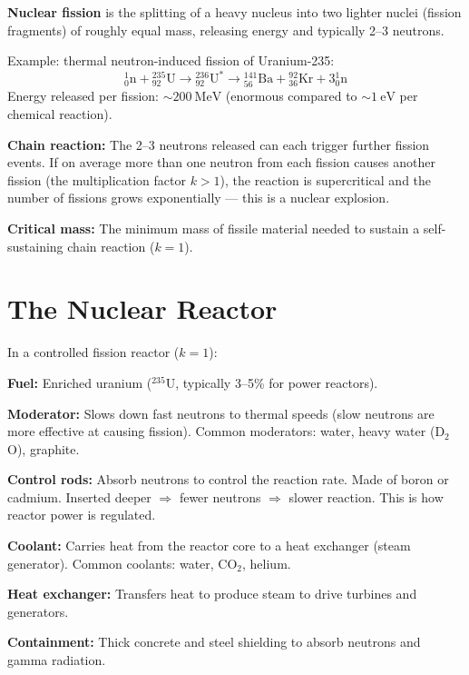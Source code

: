 \begin{definitionbox}
\textbf{Nuclear fission} is the splitting of a heavy
nucleus into two lighter nuclei (fission fragments)
of roughly equal mass, releasing energy and typically
2--3 neutrons.

Example: thermal neutron-induced fission of Uranium-235:
\[
  {}^{1}_{0}\text{n} + {}^{235}_{92}\text{U}
  \rightarrow {}^{236}_{92}\text{U}^*
  \rightarrow {}^{141}_{56}\text{Ba}
  + {}^{92}_{36}\text{Kr}
  + 3{}^{1}_{0}\text{n}
\]
Energy released per fission: $\sim 200\ \text{MeV}$
(enormous compared to $\sim 1\ \text{eV}$ per chemical
reaction).

\textbf{Chain reaction:} The 2--3 neutrons released
can each trigger further fission events. If on average
more than one neutron from each fission causes another
fission (the multiplication factor $k > 1$), the
reaction is supercritical and the number of fissions
grows exponentially --- this is a nuclear explosion.

\textbf{Critical mass:} The minimum mass of fissile
material needed to sustain a self-sustaining chain
reaction ($k = 1$).
\end{definitionbox}

\section{The Nuclear Reactor}

\begin{processbox}
In a controlled fission reactor ($k = 1$):

\textbf{Fuel:} Enriched uranium (${}^{235}$U,
typically 3--5\% for power reactors).

\textbf{Moderator:} Slows down fast neutrons to
thermal speeds (slow neutrons are more effective
at causing fission). Common moderators: water,
heavy water (D$_2$O), graphite.

\textbf{Control rods:} Absorb neutrons to control
the reaction rate. Made of boron or cadmium. Inserted
deeper $\Rightarrow$ fewer neutrons $\Rightarrow$
slower reaction. This is how reactor power is
regulated.

\textbf{Coolant:} Carries heat from the reactor core
to a heat exchanger (steam generator). Common
coolants: water, CO$_2$, helium.

\textbf{Heat exchanger:} Transfers heat to produce
steam to drive turbines and generators.

\textbf{Containment:} Thick concrete and steel
shielding to absorb neutrons and gamma radiation.
\end{processbox}


